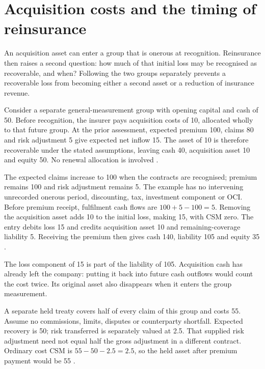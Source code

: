 \section{Acquisition costs and the timing of reinsurance}
\label{sec:insurance-acquisition-treaty}

An acquisition asset can enter a group that is onerous at recognition.
Reinsurance then raises a second question: how much of that initial loss may
be recognised as recoverable, and when? Following the two groups separately
prevents a recoverable loss from becoming either a second asset or a reduction
of insurance revenue.

Consider a separate general-measurement group with opening capital and cash
of 50. Before recognition, the insurer pays acquisition costs of 10, allocated
wholly to that future group. At the prior assessment, expected premium 100,
claims 80 and risk adjustment 5 give expected net inflow 15. The asset of 10
is therefore recoverable under the stated assumptions, leaving cash 40,
acquisition asset 10 and equity 50. No renewal allocation is involved
\citep[paragraphs 28A--28F and B35A--B35D]{aasb17}.

The expected claims increase to 100 when the contracts are recognised;
premium remains 100 and risk adjustment remains 5. The example has no
intervening unrecorded onerous period, discounting, tax, investment component
or OCI. Before premium receipt, fulfilment cash flows are $100+5-100=5$.
Removing the acquisition asset adds 10 to the initial loss, making 15,
with CSM zero. The entry debits loss 15 and credits acquisition asset 10
and remaining-coverage liability 5. Receiving the premium then gives cash
140, liability 105 and equity 35
\citep[paragraphs 28C, 38(c)(i) and 47]{aasb17}.

The loss component of 15 is part of the liability of 105. Acquisition cash
has already left the company: putting it back into future cash outflows
would count the cost twice. Its original asset also disappears when it enters
the group measurement.

A separate held treaty covers half of every claim of this group and costs
55. Assume no commissions, limits, disputes or counterparty shortfall.
Expected recovery is 50; risk transferred is separately valued at 2.5.
That supplied risk adjustment need not equal half the gross adjustment in a
different contract. Ordinary cost CSM is $55-50-2.5=2.5$, so the held
asset after premium payment would be 55
\citep[paragraphs 62--65]{aasb17}.

